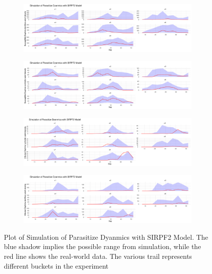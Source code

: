 \documentclass[12pt]{article}
\begin{document}
\begin{figure}[H]
\centering
\begin{subfigure}[b]{\linewidth}
\includegraphics{si-004}
\end{subfigure}
\begin{subfigure}[b]{\linewidth}
\includegraphics{si-005}
\end{subfigure}
\begin{subfigure}[b]{\linewidth}
\includegraphics{si-006}
\end{subfigure}
\begin{subfigure}[b]{\linewidth}
\includegraphics{si-007}
\end{subfigure}%
\caption{Plot of Simulation of Parasitize Dyanmics with SIRPF2 Model. The blue shadow implies the possible range from simulation, while the red line shows the real-world data. The various trail represents different buckets in the experiment}
\end{figure}
\end{document}
